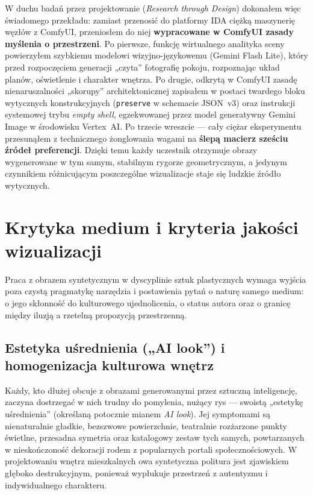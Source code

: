 W duchu badań przez projektowanie (\emph{Research through Design}) dokonałem więc świadomego przekładu: zamiast przenosić do platformy IDA ciężką maszynerię węzłów z ComfyUI, przeniosłem do niej \textbf{wypracowane w ComfyUI zasady myślenia o przestrzeni}. Po pierwsze, funkcję wirtualnego analityka sceny powierzyłem szybkiemu modelowi wizyjno-językowemu (Gemini Flash Lite), który przed rozpoczęciem generacji „czyta” fotografię pokoju, rozpoznając układ planów, oświetlenie i charakter wnętrza. Po drugie, odkrytą w ComfyUI zasadę nienaruszalności „skorupy” architektonicznej zapisałem w postaci twardego bloku wytycznych konstrukcyjnych (\texttt{preserve} w schemacie JSON~v3) oraz instrukcji systemowej trybu \emph{empty shell}, egzekwowanej przez model generatywny Gemini Image w środowisku Vertex~AI. Po trzecie wreszcie --- cały ciężar eksperymentu przesunąłem z technicznego żonglowania wagami na \textbf{ślepą macierz sześciu źródeł preferencji}. Dzięki temu każdy uczestnik otrzymuje obrazy wygenerowane w tym samym, stabilnym rygorze geometrycznym, a jedynym czynnikiem różnicującym poszczególne wizualizacje staje się ludzkie źródło wytycznych.

\section{Krytyka medium i kryteria jakości wizualizacji}
\label{ch04:sec:krytyka}

Praca z obrazem syntetycznym w dyscyplinie sztuk plastycznych wymaga wyjścia poza czystą pragmatykę narzędzia i postawienia pytań o naturę samego medium: o jego skłonność do kulturowego ujednolicenia, o status autora oraz o granicę między iluzją a rzetelną propozycją przestrzenną.

\subsection{Estetyka uśrednienia („AI look”) i homogenizacja kulturowa wnętrz}
Każdy, kto dłużej obcuje z obrazami generowanymi przez sztuczną inteligencję, zaczyna dostrzegać w nich trudny do pomylenia, nużący rys --- swoistą „estetykę uśrednienia” (określaną potocznie mianem \emph{AI look}). Jej symptomami są nienaturalnie gładkie, bezszwowe powierzchnie, teatralnie rozżarzone punkty świetlne, przesadna symetria oraz katalogowy zestaw tych samych, powtarzanych w nieskończoność dekoracji rodem z popularnych portali społecznościowych. W projektowaniu wnętrz mieszkalnych owa syntetyczna politura jest zjawiskiem głęboko destrukcyjnym, ponieważ wypłukuje przestrzeń z autentyzmu i indywidualnego charakteru.

